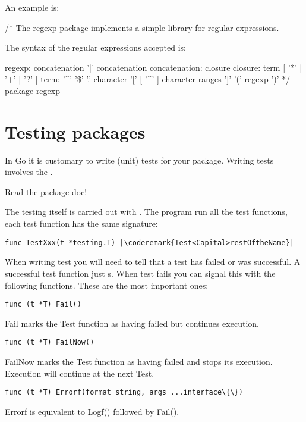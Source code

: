 An example is:
\begin{display}
/*
    The regexp package implements a simple library for
    regular expressions.

    The syntax of the regular expressions accepted is:

    regexp:
        concatenation { '|' concatenation }
    concatenation:
        { closure }
    closure:
        term [ '*' | '+' | '?' ]
    term:
        '^'
        '\$'
        '.'
        character
        '[' [ '^' ] character-ranges ']'
        '(' regexp ')'
*/
package regexp
\end{display}





\section{Testing packages}
In Go it is customary to write (unit) tests for your package. Writing
tests involves the .
\begin{lbar}
Read the package doc!
\end{lbar}

The testing itself is carried out with .
The  program run all the test functions, each
test function has the same signature:
\begin{lstlisting}
func TestXxx(t *testing.T) |\coderemark{Test<Capital>restOftheName}|
\end{lstlisting}

When writing test you will need to tell  that a test has failed or was successful. A
successful test function just s. When test fails you can signal this with the following
functions\cite{go_doc}. These are the most important ones:

\begin{lstlisting}[numbers=none]
func (t *T) Fail()
\end{lstlisting}
Fail marks the Test function as having failed but continues execution.

\begin{lstlisting}[numbers=none]
func (t *T) FailNow()
\end{lstlisting}
FailNow marks the Test function as having failed and stops its execution.
Execution will continue at the next Test.

\begin{lstlisting}[numbers=none]
func (t *T) Errorf(format string, args ...interface\{\})
\end{lstlisting}
Errorf is equivalent to Logf() followed by Fail().

